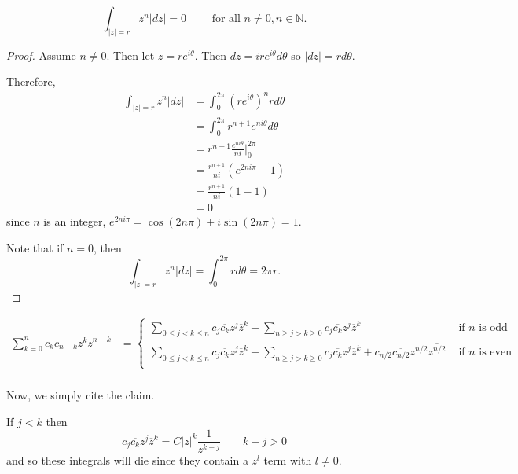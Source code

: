 \documentclass[12pt]{Qual}
\begin{document}
\begin{solution}
\begin{comment}
\boxed{n=4} We repeat the above, this time using an even $n.$ Then $$\sum_{k=0}^4z^k\overline{z}^{4-k}=\overline{z}^4+z\overline{z}^3+z^2\overline{z}^2+z^3\overline{z}+z^4=\frac{|z|^8}{z^4}+\frac{|z|^6}{z^2}+|z|^4+z^2|z|^2+z^4.$$

Note that all of these integrals will vanish as none of them have a $\frac{1}{z}$ term.

Now, we generalize.
\end{comment}

\begin{claim} $$\int_{|z|=r}z^n|dz|=0\qquad\text{ for all }n\not=0,n\in\mathbb{N}.$$
\begin{proof} Assume $n\not=0.$ Then let $z=re^{i\theta}$. Then $dz=ire^{i\theta}d\theta$ so $|dz|=rd\theta$.

Therefore, \begin{align*}
    \int_{|z|=r}z^n|dz|&=\int_0^{2\pi}(re^{i\theta})^nrd\theta\\
    &=\int_0^{2\pi}r^{n+1}e^{ni\theta}d\theta\\
    &=r^{n+1}\frac{e^{ni\theta}}{ni}\big|_0^{2\pi}\\
    &=\frac{r^{n+1}}{ni}(e^{2ni\pi}-1)\\
    &=\frac{r^{n+1}}{ni}(1-1)\\
    &=0
\end{align*} since $n$ is an integer, $e^{2ni\pi}=\cos(2n\pi)+i\sin(2n\pi)=1.$

Note that if $n=0$, then $$\int_{|z|=r}z^n|dz|=\int_0^{2\pi}rd\theta=2\pi r.$$
\end{proof}
\end{claim}

\begin{align*}
    \sum_{k=0}^nc_k\overline{c_{n-k}}z^k\overline{z}^{n-k}&=\begin{cases}
    \sum_{0\le j<k\le n}c_j\overline{c_k}z^j\overline{z}^k+\sum_{n\ge j>k\ge0}c_j\overline{c_k}z^j\overline{z}^k & \text{ if }n\text{ is odd }\\
    \sum_{0\le j<k\le n}c_j\overline{c_k}z^j\overline{z}^k+\sum_{n\ge j>k\ge0}c_j\overline{c_k}z^j\overline{z}^k  +c_{n/2}\overline{c_{n/2}}z^{n/2}\overline{z^{n/2}}& \text{ if }n\text{ is even }\\
    \end{cases}\\
\end{align*}

Now, we simply cite the claim.

If $j<k$ then $$c_j\overline{c_k}z^j\overline{z}^k=C|z|^k\frac{1}{z^{k-j}}\qquad k-j>0$$ and so these integrals will die since they contain a $z^l$ term with $l\not=0.$


\end{solution}
\end{document}
